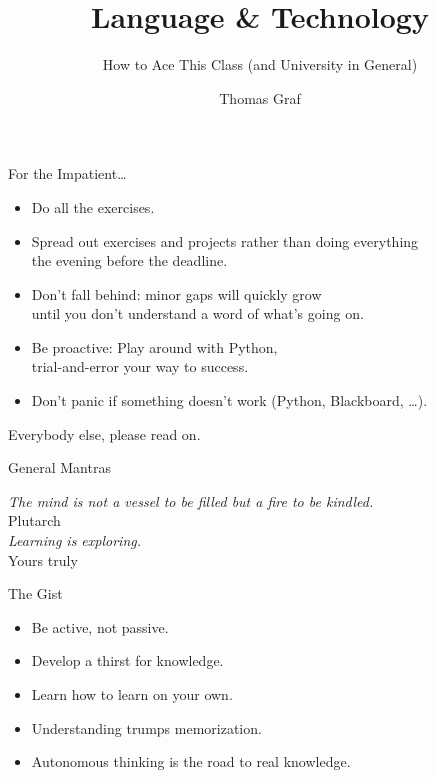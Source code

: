 \documentclass[professionalfonts, xcolor={usenames,svgnames,x11names,table}]{beamer}
\title{\texorpdfstring{Language \& Technology}{Language and Technology}}
\subtitle{How to Ace This Class (and University in General)}
\author{Thomas Graf}
\institute{Stony Brook University\\\texttt{lin120@thomasgraf.net}}
\date{}
\begin{document}
\unnumbered{
\begin{frame}
	\titlepage
\end{frame}
}

\begin{frame}{For the Impatient\ldots}
    \begin{itemize}
        \item Do all the exercises.
        \item Spread out exercises and projects rather than doing everything\\
            the evening before the deadline.
        \item Don't fall behind: minor gaps will quickly grow\\
            until you don't understand a word of what's going on.
        \item Be proactive: Play around with Python,\\
            trial-and-error your way to success.
        \item Don't panic if something doesn't work (Python, Blackboard, \ldots).
    \end{itemize}

    Everybody else, please read on.
\end{frame}

\begin{frame}{General Mantras}
    \begin{flushright}
        \begin{minipage}[b]{28em}
            \flushright
            \emph{The mind is not a vessel to be filled but a fire to be kindled.}\\
            Plutarch\\

            \medskip
            \emph{Learning is exploring.}\\
            Yours truly
        \end{minipage}
    \end{flushright}

    \begin{block}{The Gist}
        \begin{itemize}
            \item Be active, not passive.
            \item Develop a thirst for knowledge.
            \item Learn how to learn on your own.
            \item Understanding trumps memorization.
            \item Autonomous thinking is the road to real knowledge.
        \end{itemize}
    \end{block}
\end{frame}
\end{document}
